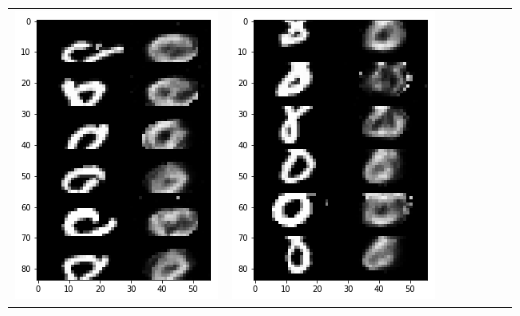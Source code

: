 \documentclass[12pt]{report} %
\begin{document}
\begin{tabular}{m{0.7cm}m{2.4cm}m{2.4cm}m{2.4cm}m{2.4cm}m{2.4cm}m{2.4cm}}
	\includegraphics[scale=0.3]{pictures/M1_8_up.png} & \includegraphics[scale=0.3]{pictures/M1_8_down.png} &

\end{tabular}
\end{document}
